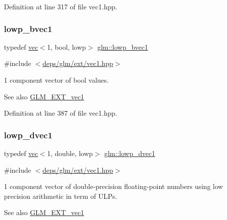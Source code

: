 Definition at line 317 of file vec1.\+hpp.

\mbox{\label{group__ext__vec1_ga861bf958322f2909514b1256be428490}} 
\subsubsection{\texorpdfstring{lowp\+\_\+bvec1}{lowp\_bvec1}}
{\footnotesize\ttfamily typedef \hyperlink{structglm_1_1vec}{vec}$<$1, bool, lowp$>$ \hyperlink{group__ext__vec1_ga861bf958322f2909514b1256be428490}{glm\+::lowp\+\_\+bvec1}}



{\ttfamily \#include $<$\hyperlink{ext_2vec1_8hpp}{deps/glm/ext/vec1.\+hpp}$>$}

1 component vector of bool values.

\begin{DoxySeeAlso}{See also}
\hyperlink{group__ext__vec1}{G\+L\+M\+\_\+\+E\+X\+T\+\_\+vec1} 
\end{DoxySeeAlso}


Definition at line 387 of file vec1.\+hpp.

\mbox{\label{group__ext__vec1_ga4fa455d945a1e3e591689464c0f9090f}} 
\subsubsection{\texorpdfstring{lowp\+\_\+dvec1}{lowp\_dvec1}}
{\footnotesize\ttfamily typedef \hyperlink{structglm_1_1vec}{vec}$<$1, double, lowp$>$ \hyperlink{group__ext__vec1_ga4fa455d945a1e3e591689464c0f9090f}{glm\+::lowp\+\_\+dvec1}}



{\ttfamily \#include $<$\hyperlink{ext_2vec1_8hpp}{deps/glm/ext/vec1.\+hpp}$>$}

1 component vector of double-\/precision floating-\/point numbers using low precision arithmetic in term of U\+L\+Ps.

\begin{DoxySeeAlso}{See also}
\hyperlink{group__ext__vec1}{G\+L\+M\+\_\+\+E\+X\+T\+\_\+vec1} 
\end{DoxySeeAlso}


